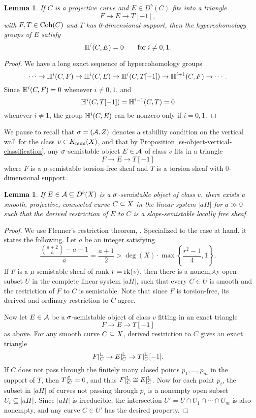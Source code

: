 \documentclass[letterpaper,12pt]{amsart}
\newtheorem{lem}[thm]{Lemma}
\theoremstyle{remark}
\begin{document}
\begin{lem}\label{hypercohovanishing}
    If $C$ is a projective curve and $E \in D^b(C)$ fits into a triangle
    \[ F \to E \to T[-1], \]
    with $F, T \in \mathrm{Coh}(C)$ and $T$ has 0-dimensional support, then the hypercohomology groups of $E$ satisfy
    \[ \mathbb{H}^i(C, E) = 0 \qquad \mathrm{for} \; i \neq 0, 1. \]
\end{lem}
\begin{proof}
    We have a long exact sequence of hypercohomology groups
    \[ \cdots \to \mathbb{H}^i(C, F) \to \mathbb{H}^i(C, E) \to \mathbb{H}^i(C, T[-1]) \to \mathbb{H}^{i+1}(C, F) \to \cdots. \]
    Since $\mathbb{H}^i(C, F) = 0$ whenever $i \neq 0, 1$, and 
    \[ \mathbb{H}^i(C, T[-1]) = \mathbb{H}^{i-1}(C, T) = 0 \] 
    whenever $i \neq 1$, the group $\mathbb{H}^i(C, E)$ can be nonzero only if $i = 0,1$.
\end{proof}

We pause to recall that $\sigma = (\mathcal{A}, Z)$ denotes a stability condition on the vertical wall for the class $v \in K_{\mathrm{num}}(X)$, and that by Proposition \ref{ss-object-vertical-classification}, any $\sigma$-semistable object $E \in \mathcal{A}$ of class $v$ fits in a triangle
\[ F \to E \to T[-1] \]
where $F$ is a $\mu$-semistable torsion-free sheaf and $T$ is a torsion sheaf with 0-dimensional support. 

\begin{lem}\label{restsemistable}
    If $E \in \mathcal{A} \subseteq D^b(X)$ is a $\sigma$-semistable object of class $v$, there exists a smooth, projective, connected curve $C \subseteq X$ in the linear system $|a H|$ for $a \gg 0$ such that the derived restriction of $E$ to $C$ is a slope-semistable locally free sheaf.    
\end{lem}
\begin{proof} 
We use Flenner's restriction theorem, \cite[Theorem 7.1.1]{HL}. Specialized to the case at hand, it states the following. Let $a$ be an integer satisfying
\[ \frac{\binom{a+2}{a} - a - 1}{a} = \frac{a+1}{2} > \deg(X) \cdot \max\left\{\frac{r^2 - 1}{4}, 1\right\}. \]
If $F$ is a $\mu$-semistable sheaf of rank $r = \operatorname{\mathrm{rk}}(v)$, then there is a nonempty open subset $U$ in the complete linear system $|aH|$, such that every $C \in U$ is smooth and the restriction of $F$ to $C$ is semistable. Note that since $F$ is torsion-free, its derived and ordinary restriction to $C$ agree.

Now let $E \in \mathcal{A}$ be a $\sigma$-semistable object of class $v$ fitting in an exact triangle
\[ F \to E \to T[-1] \]
as above. For any smooth curve $C \subseteq X$, derived restriction to $C$ gives an exact triangle
\[ F|_C^{\mathbb{L}} \to E|_C^{\mathbb{L}} \to T|_C^{\mathbb{L}}[-1]. \]
If $C$ does not pass through the finitely many closed points $p_1,\ldots,p_m$ in the support of $T$, then $T|_C^{\mathbb{L}} = 0$, and thus $F|_C^{\mathbb{L}} \cong E|_C^{\mathbb{L}}$. Now for each point $p_i$, the subset in $|a H|$ of curves not passing through $p_i$ is a nonempty open subset $U_i \subseteq |a H|$. Since $|a H|$ is irreducible, the intersection $U' = U \cap U_1 \cap \cdots \cap U_m$ is also nonempty, and any curve $C \in U'$ has the desired property. 
\end{proof}
\end{document}
